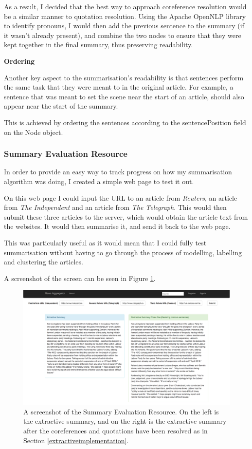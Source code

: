 \documentclass[12pt]{article}
\begin{document}
As a result, I decided that the best way to approach coreference resolution would be a similar manner to quotation resolution. Using the Apache OpenNLP library to identify pronouns, I would then add the previous sentence to the summary (if it wasn't already present), and combine the two nodes to ensure that they were kept together in the final summary, thus preserving readability.

\textbf{Ordering}

Another key aspect to the summarisation's readability is that sentences perform the same task that they were meant to in the original article. For example, a sentence that was meant to set the scene near the start of an article, should also appear near the start of the summary. 

This is achieved by ordering the sentences according to the sentencePosition field on the Node object. 

\subsubsection{Summary Evaluation Resource}

In order to provide an easy way to track progress on how my summarisation algorithm was doing, I created a simple web page to test it out. 

On this web page I could input the URL to an article from \emph{Reuters}, an article from \emph{The Independent} and an article from \emph{The Telegraph}. This would then submit these three articles to the server, which would obtain the article text from the websites. It would then summarise it, and send it back to the web page.

This was particularly useful as it would mean that I could fully test summarisation without having to go through the process of modelling, labelling and clustering the articles.

A screenshot of the screen can be seen in Figure \ref{summaryevaluationresource}.

\begin{figure}[ht!]
  \centering
    \includegraphics[scale=0.3]{SummaryEvaluationResource}
   \caption[A screenshot of the Summary Evaluation Resource]{A screenshot of the Summary Evaluation Resource. On the left is the extractive summary, and on the right is the extractive summary after the coreferences and quotations have been resolved as in Section \ref{extractiveimplementation}.}
   \label{summaryevaluationresource}
\end{figure} 
\end{document}
